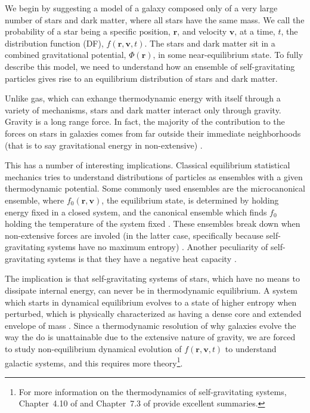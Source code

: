 We begin by suggesting a model of a galaxy composed only of a very large number of stars and dark matter, where all stars have the same mass. We call the probability of a star being a specific position, $\textbf{r}$, and velocity $\textbf{v}$, at a time, $t$, the distribution function (DF), $f(\textbf{r},\textbf{v},t)$. The stars and dark matter sit in a combined gravitational potential, $\Phi(\textbf{r})$, in some near-equilibrium state. To fully describe this model, we need to understand how an ensemble of self-gravitating particles gives rise to an equilibrium distribution of stars and dark matter.

Unlike gas, which can exhange thermodynamic energy with itself through a variety of mechanisms, stars and dark matter interact only through gravity. Gravity is a long range force. In fact, the majority of the contribution to the forces on stars in galaxies comes from far outside their immediate neighborhoods (that is to say gravitational energy in non-extensive) \citep{BT}. 

This has a number of interesting implications. Classical equilibrium statistical mechanics tries to understand distributions of particles as ensembles with a given thermodynamic potential. Some commonly used ensembles are the microcanonical ensemble, where $f_0(\textbf{r},\textbf{v})$, the equilibrium state, is determined by holding energy fixed in a closed system, and the canonical ensemble which finds $f_0$ holding the temperature of the system fixed \citep{sethna}. These ensembles break down when non-extensive forces are involed (in the latter case, specifically because self-gravitating systems have no maximum entropy) \citep{self_gravitating_statistical_mechanics,lb_negative_specific_heat, BT}. Another peculiarity of self-gravitating systems is that they have a negative heat capacity \citep{lb_negative_specific_heat}.

The implication is that self-gravitating systems of stars, which have no means to dissipate internal energy, can never be in thermodynamic equilibrium. A system which starts in dynamical equilibrium evolves to a state of higher entropy when perturbed, which is physically characterized as having a dense core and extended envelope of mass \citep{BT}. Since a thermodynamic resolution of why galaxies evolve the way the do is unattainable due to the extensive nature of gravity, we are forced to study non-equilibrium dynamical evolution of $f(\textbf{r},\textbf{v},t)$ to understand galactic systems, and this requires more theory\footnote{For more information on the thermodynamics of self-gravitating systems, Chapter~4.10 of \citet{BT} and Chapter~7.3 of \citet{BT} provide excellent summaries.}.

